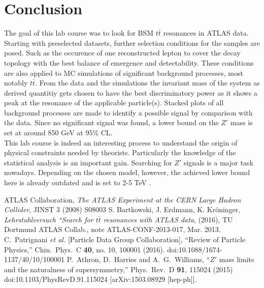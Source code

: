 \section{Conclusion}
The goal of this lab course was to look for BSM $t\bar t$ resonances in ATLAS data. Starting with preselected datasets, further selection conditions 
for the samples are posed. Such as the occurence of one reconstructed lepton to cover the decay topology with the best balance of emergence and
detectability. These conditions are also applied to MC simulations of significant background processes, most notably $t\bar t$. From the data and
the simulations the invariant mass of the system as derived quantitiy gets chosen to have the best discriminatory power as it shows a peak at 
the resonance of the applicable particle(s). Stacked plots of all background processes are made to identify a possible signal by comparison with
the data. Since no significant signal was found, a lower bound on the $Z'$ mass is set at around 850 GeV at 95\% CL.\\
\noindent This lab course is indeed an interesting process to understand the origin of physical constraints needed by theorists. Particularly the 
knowledge of the statistical analysis is an important gain.
Searching for $Z'$ signals is a major task nowadays. Depending on the chosen
model, however, the achieved lower bound here is already outdated and is set to 2-5 TeV \cite{Atlaslimits}\cite{pdg}\cite{1503.08929}.

\newpage
 \begin{thebibliography}{WissOnl}
  ATLAS Collaboration, \textit{The ATLAS Experiment at the CERN Large Hadron Collider}, JINST 3 (2008) S08003
  S. Bartkowski, J. Erdmann, K. Kröninger, \textit{Lehrstuhlversuch ``Search for $t\bar t$ resonances with ATLAS data}, (2016), TU Dortmund
  ATLAS Collab., note ATLAS-CONF-2013-017, Mar. 2013.
    C.~Patrignani {\it et al.} [Particle Data Group Collaboration],
 ``Review of Particle Physics,''
  Chin.\ Phys.\ C {\bf 40}, no. 10, 100001 (2016).
  doi:10.1088/1674-1137/40/10/100001
   P.~Athron, D.~Harries and A.~G.~Williams,
  ``$Z'$ mass limits and the naturalness of supersymmetry,''
  Phys.\ Rev.\ D {\bf 91}, 115024 (2015)
  doi:10.1103/PhysRevD.91.115024
  [arXiv:1503.08929 [hep-ph]].
 \end{thebibliography}




